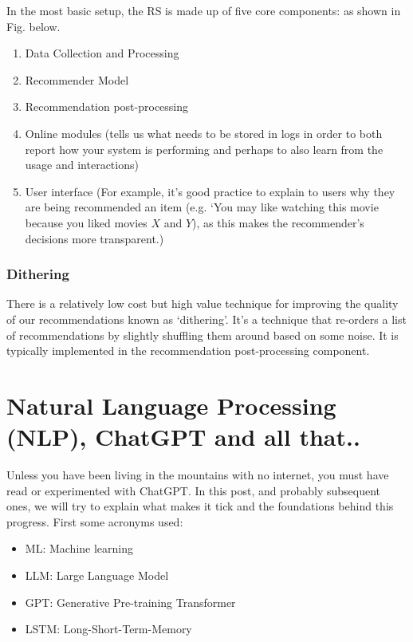 \documentclass[11pt]{article}
\begin{document}
In the most basic setup, the RS is made up of five core components:
as shown in Fig. below. 

\begin{enumerate}
\item Data Collection and Processing 
\item Recommender Model
\item Recommendation post-processing
\item Online modules (tells us what needs to be stored in logs in order to both report how your system is performing and perhaps to also learn from the usage and interactions)
\item User interface (For example, it’s good practice to explain to users why they are being recommended an item (e.g. `You may like watching this movie because you liked movies $X$ and $Y$), as this makes the recommender’s decisions more transparent.)
\end{enumerate} 


\subsubsection{Dithering}

There is a relatively low cost but high value technique for improving the quality of our 
recommendations known as `dithering'. It’s a technique that re-orders a list of recommendations by slightly shuffling them around based on some noise. 
It is typically implemented in the recommendation post-processing component.





\section{Natural Language Processing (NLP), ChatGPT and all that..}

Unless you have been living in the mountains with no internet, you must have read 
or experimented with ChatGPT. In this post, and probably subsequent ones, we will try to explain 
what makes it tick and the foundations behind this progress. First some acronyms used:

\begin{itemize}
\item ML: Machine learning
\item LLM: Large Language Model
\item GPT: Generative Pre-training Transformer
\item LSTM: Long-Short-Term-Memory
\end{itemize}
\end{document}
